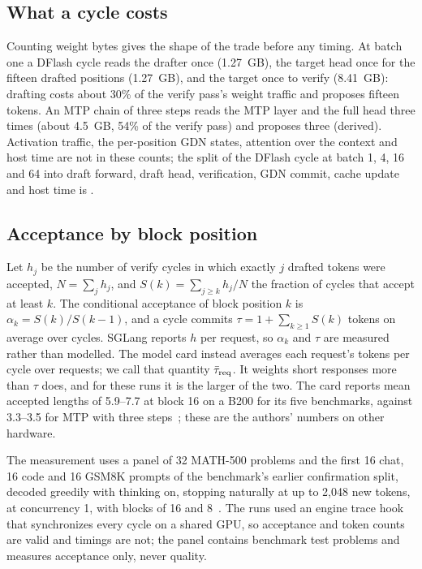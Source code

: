 \subsection{What a cycle costs}\label{sec:drafter-cost}
Counting weight bytes gives the shape of the trade before any timing. At batch one a DFlash cycle reads the drafter once (1.27~GB), the target head once for the fifteen drafted positions (1.27~GB), and the target once to verify (8.41~GB): drafting costs about 30\% of the verify pass's weight traffic and proposes fifteen tokens. An MTP chain of three steps reads the MTP layer and the full head three times (about 4.5~GB, 54\% of the verify pass) and proposes three (derived). Activation traffic, the per-position GDN states, attention over the context and host time are not in these counts; the split of the DFlash cycle at batch 1, 4, 16 and 64 into draft forward, draft head, verification, GDN commit, cache update and host time is .

\subsection{Acceptance by block position}\label{sec:drafter-acceptance}
Let $h_j$ be the number of verify cycles in which exactly $j$ drafted tokens were accepted, $N=\sum_jh_j$, and $S(k)=\sum_{j\ge k}h_j/N$ the fraction of cycles that accept at least $k$. The conditional acceptance of block position $k$ is $\alpha_k=S(k)/S(k-1)$, and a cycle commits $\tau=1+\sum_{k\ge1}S(k)$ tokens on average over cycles. SGLang reports $h$ per request, so $\alpha_k$ and $\tau$ are measured rather than modelled. The model card instead averages each request's tokens per cycle over requests; we call that quantity $\bar\tau_{\rm req}$. It weights short responses more than $\tau$ does, and for these runs it is the larger of the two. The card reports mean accepted lengths of 5.9--7.7 at block 16 on a B200 for its five benchmarks, against 3.3--3.5 for MTP with three steps~\cite{dflash4bcard}; these are the authors' numbers on other hardware.

The measurement uses a panel of 32 MATH-500 problems and the first 16 chat, 16 code and 16 GSM8K prompts of the benchmark's earlier confirmation split, decoded greedily with thinking on, stopping naturally at up to 2,048 new tokens, at concurrency 1, with blocks of 16 and 8~. The runs used an engine trace hook that synchronizes every cycle on a shared GPU, so acceptance and token counts are valid and timings are not; the panel contains benchmark test problems and measures acceptance only, never quality.

